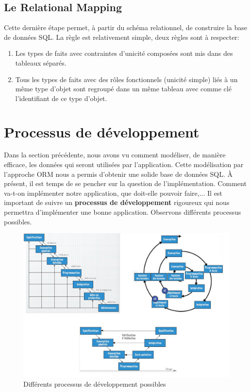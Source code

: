 \subsection{Le Relational Mapping}
Cette dernière étape permet, à partir du schéma relationnel,
de construire la base de données SQL.
La règle est relativement simple, deux règles sont à respecter:
\begin{enumerate}
  \item Les types de faits avec contraintes d'unicité composées
    sont mis dans des tableaux séparés.
  \item Tous les types de faits avec des rôles fonctionnels (unicité simple)
    liés à un même type d'objet sont regroupé dans un même tableau
    avec comme clé l'identifiant de ce type d'objet.
\end{enumerate}

\section{Processus de développement}
Dans la section précédente, nous avons vu comment modéliser,
de manière efficace, les données qui seront utilisées par l'application.
Cette modélisation par l'approche ORM nous a permis d'obtenir une solide
base de données SQL.
À présent, il est temps de se pencher sur la question de l'implémentation.
Comment va-t-on implémenter notre application, que doit-elle pouvoir faire,...
Il est important de suivre un \textbf{processus de développement}
rigoureux qui nous permettra d'implémenter une bonne application.
Observons différents processus possibles.

\begin{figure}[h]
  \centering
  \includegraphics[scale=0.58]{processus_developpement_example.jpg}
  \caption{Différents processus de développement possibles}
  \label{processus_developpement_example}
\end{figure}

